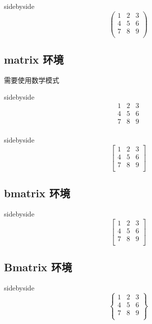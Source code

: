 \documentclass[cn,chinese,color=cyan]{elegantbook}
\begin{document}
\begin{tcblisting}{sidebyside}
$$
\left(
\begin{array}{ccc}
1&2&3 \\
4&5&6 \\
7&8&9 \\
\end{array}
\right)
$$
\end{tcblisting}
\subsection{matrix 环境}
需要使用数学模式
\begin{tcblisting}{sidebyside}
$$
\begin{matrix}
1&2&3 \\
4&5&6 \\
7&8&9 \\
\end{matrix}
$$
\end{tcblisting}


\begin{tcblisting}{sidebyside}
\[
\left[
\begin{matrix}
1&2&3 \\
4&5&6 \\
7&8&9 \\
\end{matrix}
\right]
\]
\end{tcblisting}

\subsection{bmatrix 环境}
\begin{tcblisting}{sidebyside}
\[
\begin{bmatrix}
1&2&3 \\
4&5&6 \\
7&8&9 \\
\end{bmatrix}
\]
\end{tcblisting}


\subsection{Bmatrix 环境}
\begin{tcblisting}{sidebyside}
$$
\begin{Bmatrix}
1&2&3 \\
4&5&6 \\
7&8&9 \\
\end{Bmatrix}
$$
\end{tcblisting}
\end{document}
